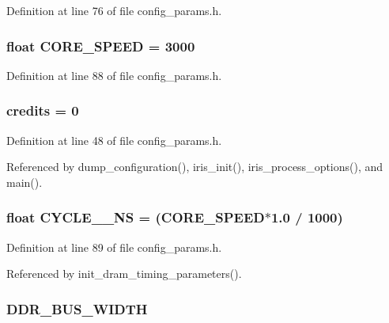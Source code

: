Definition at line 76 of file config\_\-params.h.
\subsubsection[{CORE\_\-SPEED}]{\setlength{\rightskip}{0pt plus 5cm}float {\bf CORE\_\-SPEED} = 3000}\label{config__params_8h_caed83499d078ca4534df759dc75445c}




Definition at line 88 of file config\_\-params.h.
\subsubsection[{credits}]{ {\bf credits} = 0}\label{config__params_8h_a0f16f2b9c6bb8d38139a2b9f520d184}




Definition at line 48 of file config\_\-params.h.

Referenced by dump\_\-configuration(), iris\_\-init(), iris\_\-process\_\-options(), and main().
\subsubsection[{CYCLE\_\-2\_\-NS}]{\setlength{\rightskip}{0pt plus 5cm}float {\bf CYCLE\_\_\-NS} = ({\bf CORE\_\-SPEED}$\ast$1.0 / 1000)}\label{config__params_8h_95a920a6fa24ef6369f937f9df4e23c8}




Definition at line 89 of file config\_\-params.h.

Referenced by init\_\-dram\_\-timing\_\-parameters().
\subsubsection[{DDR\_\-BUS\_\-WIDTH}]{ {\bf DDR\_\-BUS\_\-WIDTH}}\label{config__params_8h_c8c3d8aa62537d9f6ced46f883d8099b}




